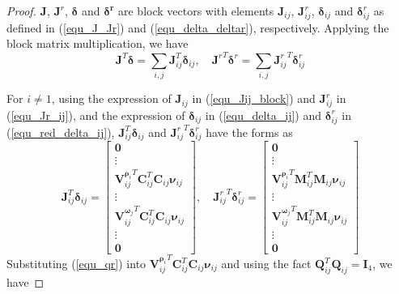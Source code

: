 \documentclass{vgtc}                          %
\begin{document}
\begin{proof}
	$\mathbf{J}$, $\mathbf{J}^{r}$,  $\mathbf{\bm{\delta}}$ and $\mathbf{\bm{\delta}^{r}}$ are block vectors with elements $\mathbf{J}_{ij}$,  $\mathbf{J}_{ij}^{r}$, $\mathbf{\bm{\delta}}_{ij}$ and $\mathbf{\bm{\delta}}_{ij}^{r}$  as defined in (\ref{equ_J_Jr}) and (\ref{equ_delta_deltar}), respectively. Applying the block matrix multiplication, we have 
	\begin{equation} \label{equ_J_delta}
		\mathbf{J}^{T}\bm{\delta} = \sum_{i,j}\mathbf{J}_{ij}^{T}\bm{\delta}_{ij}, \quad {\mathbf{J}^{r}}^{T}\bm{\delta}^{r} = \sum_{i,j}{\mathbf{J}_{ij}^{r}}^{T}\bm{\delta}_{ij}^{r}
	\end{equation}
	
	For $i \neq 1$, using the expression of $\mathbf{J}_{ij}$ in (\ref{equ_Jij_block}) and $\mathbf{J}_{ij}^{r}$ in (\ref{equ_Jr_ij}), and the expression of $\bm{\delta}_{ij}$ in (\ref{equ_delta_ij}) and $\bm{\delta}_{ij}^{r}$ in (\ref{equ_red_delta_ij}),  $\mathbf{J}_{ij}^{T}\bm{\delta}_{ij}$ and ${\mathbf{J}_{ij}^{r}}^{T}\bm{\delta}_{ij}^{r}$ have the forms as
	\begin{equation} \label{equ_J_delta_Jr_delta}
		\mathbf{J}_{ij}^{T}\bm{\delta}_{ij} =\begin{bmatrix}
				\mathbf{0} \\
				\vdots        \\
				{\bm{V}^{\bm{\rho}_{i}}_{ij}}^{T}\mathbf{C}_{ij}^{T}\mathbf{C}_{ij}\bm{\nu}_{ij}\\
				\vdots        \\
				{\bm{V}^{\bm{\omega}_{j}}_{ij}}^{T}\mathbf{C}_{ij}^{T}\mathbf{C}_{ij}\bm{\nu}_{ij} \\
				\vdots \\
				\mathbf{0}
		\end{bmatrix}, \quad 
		{\mathbf{J}_{ij}^{r}}^{T}\bm{\delta}_{ij}^{r} =\begin{bmatrix}
			\mathbf{0} \\
			\vdots        \\
			{\bm{V}^{\bm{\rho}_{i}}_{ij}}^{T}\mathbf{M}_{ij}^{T}\mathbf{M}_{ij}\bm{\nu}_{ij} \\
			\vdots        \\
			{\bm{V}^{\bm{\omega}_{j}}_{ij}}^{T}\mathbf{M}_{ij}^{T}\mathbf{M}_{ij}\bm{\nu}_{ij} \\
			\vdots \\
			\mathbf{0}
		\end{bmatrix} 
	\end{equation}
	Substituting (\ref{equ_qr}) into 	${\bm{V}^{\bm{\rho}_{i}}_{ij}}^{T}\mathbf{C}_{ij}^{T}\mathbf{C}_{ij}\bm{\nu}_{ij}$ and  using the fact $\mathbf{Q}_{ij}^{T}\mathbf{Q}_{ij} = \mathbf{I}_{4}$, we have 

\end{proof}
\end{document}
